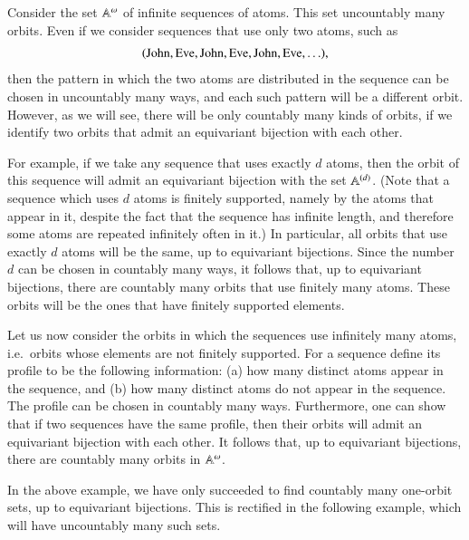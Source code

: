 \begin{myexample}
    Consider the set $\mathbb A^\omega$ of infinite sequences of atoms. This set uncountably many orbits. Even if we consider sequences that use only two atoms, such as 
\begin{align*}
(\text{John},\text{Eve},\text{John},\text{Eve},\text{John},\text{Eve},\ldots),
\end{align*}
then the pattern in which the two atoms are distributed in the sequence can be chosen in uncountably many ways, and each such pattern will be a different orbit.  However, as we will see, there will be only countably many kinds of orbits, if we identify two orbits that admit an equivariant bijection with each other. 

For example, if we take any sequence that uses exactly $d$ atoms, then the orbit of this sequence will admit an equivariant bijection with the set $\mathbb A^{(d)}$. (Note that a sequence which uses $d$ atoms is finitely supported, namely by the atoms that appear in it, despite the fact that the sequence has infinite length, and therefore some atoms  are repeated infinitely often in it.) In particular, all  orbits that use exactly $d$ atoms will be the same, up to equivariant bijections. Since the number $d$ can be chosen in countably many ways, it follows that, up to equivariant bijections, there are countably many orbits that use finitely many atoms. These orbits will be the ones that have finitely supported elements. 

Let us now consider the orbits in which the sequences use infinitely many atoms, i.e.~orbits whose elements are not finitely supported. For a sequence define its profile to be the following information: (a) how many distinct atoms appear in the sequence, and (b) how many distinct  atoms do not appear in the sequence. The profile can be chosen in countably many ways. Furthermore, one can show that if two sequences have the same profile, then their orbits will admit an equivariant bijection with each other. It follows that, up to equivariant bijections, there are countably many orbits in $\mathbb A^\omega$.
\end{myexample}

In the above example, we have only succeeded to find countably many one-orbit sets, up to equivariant bijections.  This is rectified in the following example, which will have uncountably many such sets.

